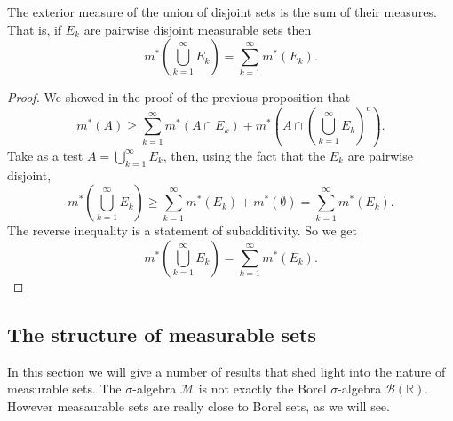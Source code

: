 \documentclass[12pt,oneside]{book}
\numberwithin{table}{section}
\numberwithin{equation}{section}
\numberwithin{figure}{section}
\newcommand{\R}{\mathbb{R}}
\newcommand{\B}{\mathcal{B}}
\newcommand{\M}{\mathcal{M}}
\newcommand{\ext}[1]{m^* \! \left( #1 \right)}
\begin{document}
\begin{proposition}
	The exterior measure of the union of disjoint sets is the sum of their measures. That is, if \( E_k \) are pairwise disjoint measurable sets then
	\begin{equation*}
		\ext{\bigcup_{k = 1}^\infty E_k} = \sum_{k = 1}^{\infty} \ext{E_k}. 
	\end{equation*}
\end{proposition}
\begin{proof}
	We showed in the proof of the previous proposition that
	\begin{equation*}
		\ext{A} \geq \sum_{k = 1}^\infty \ext{A \cap E_k} + \ext{A \cap \left(\bigcup_{k = 1}^\infty E_k\right)^c}.
	\end{equation*}
	Take as a test \( A = \bigcup_{k = 1}^\infty E_k \), then, using the fact that the \( E_k \) are pairwise disjoint,
	\begin{equation*}
		\ext{\bigcup_{k = 1}^\infty E_k} \geq \sum_{k = 1}^\infty \ext{E_k} + \ext{\emptyset} = \sum_{k = 1}^\infty \ext{E_k}.
	\end{equation*}
	The reverse inequality is a statement of subadditivity. So we get
	\begin{equation*}
		\ext{\bigcup_{k = 1}^\infty E_k} = \sum_{k = 1}^\infty \ext{E_k}.
	\end{equation*}
\end{proof}

\subsection{The structure of measurable sets}
In this section we will give a number of results that shed light into the nature of measurable sets. The \( \sigma \)-algebra \( \M \) is not exactly the Borel \( \sigma \)-algebra \( \B(\R) \). However measaurable sets are really close to Borel sets, as we will see.
\end{document}
